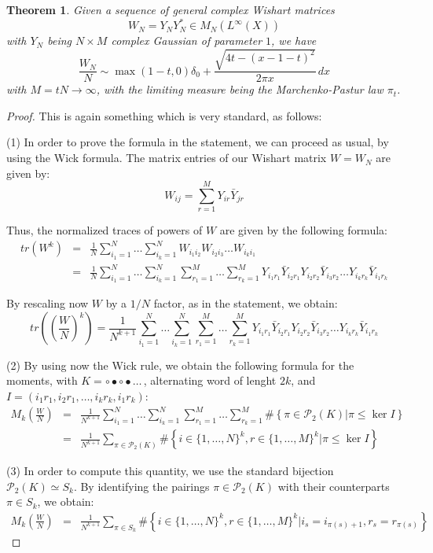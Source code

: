 \documentclass[12pt]{amsbook}
\newtheorem{theorem}{Theorem}[chapter]
\begin{document}
\begin{theorem}
Given a sequence of general complex Wishart matrices
$$W_N=Y_NY_N^*\in M_N(L^\infty(X))$$
with $Y_N$ being $N\times M$ complex Gaussian of parameter $1$, we have
$$\frac{W_N}{N}\sim\max(1-t,0)\delta_0+\frac{\sqrt{4t-(x-1-t)^2}}{2\pi x}\,dx$$
with $M=tN\to\infty$, with the limiting measure being the Marchenko-Pastur law $\pi_t$.
\end{theorem}

\begin{proof}
This is again something which is very standard, as follows:

\medskip

(1) In order to prove the formula in the statement, we can proceed as usual, by using the Wick formula. The matrix entries of our Wishart matrix $W=W_N$ are given by:
$$W_{ij}=\sum_{r=1}^MY_{ir}\bar{Y}_{jr}$$

Thus, the normalized traces of powers of $W$ are given by the following formula:
\begin{eqnarray*}
tr(W^k)
&=&\frac{1}{N}\sum_{i_1=1}^N\ldots\sum_{i_k=1}^NW_{i_1i_2}W_{i_2i_3}\ldots W_{i_ki_1}\\
&=&\frac{1}{N}\sum_{i_1=1}^N\ldots\sum_{i_k=1}^N\sum_{r_1=1}^M\ldots\sum_{r_k=1}^MY_{i_1r_1}\bar{Y}_{i_2r_1}Y_{i_2r_2}\bar{Y}_{i_3r_2}\ldots Y_{i_kr_k}\bar{Y}_{i_1r_k}
\end{eqnarray*}

By rescaling now $W$ by a $1/N$ factor, as in the statement, we obtain:
$$tr\left(\left(\frac{W}{N}\right)^k\right)=\frac{1}{N^{k+1}}\sum_{i_1=1}^N\ldots\sum_{i_k=1}^N\sum_{r_1=1}^M\ldots\sum_{r_k=1}^MY_{i_1r_1}\bar{Y}_{i_2r_1}Y_{i_2r_2}\bar{Y}_{i_3r_2}\ldots Y_{i_kr_k}\bar{Y}_{i_1r_k}$$

(2) By using now the Wick rule, we obtain the following formula for the moments, with $K=\circ\bullet\circ\bullet\ldots\,$, alternating word of lenght $2k$, and $I=(i_1r_1,i_2r_1,\ldots,i_kr_k,i_1r_k)$:
\begin{eqnarray*}
M_k\left(\frac{W}{N}\right)
&=&\frac{1}{N^{k+1}}\sum_{i_1=1}^N\ldots\sum_{i_k=1}^N\sum_{r_1=1}^M\ldots\sum_{r_k=1}^M\#\left\{\pi\in\mathcal P_2(K)\Big|\pi\leq\ker I\right\}\\
&=&\frac{1}{N^{k+1}}\sum_{\pi\in\mathcal P_2(K)}\#\left\{i\in\{1,\ldots,N\}^k,r\in\{1,\ldots,M\}^k\Big|\pi\leq\ker I\right\}
\end{eqnarray*}

(3) In order to compute this quantity, we use the standard bijection $\mathcal P_2(K)\simeq S_k$. By identifying the pairings $\pi\in\mathcal P_2(K)$ with their counterparts $\pi\in S_k$, we obtain:
\begin{eqnarray*}
M_k\left(\frac{W}{N}\right)
&=&\frac{1}{N^{k+1}}\sum_{\pi\in S_k}\#\left\{i\in\{1,\ldots,N\}^k,r\in\{1,\ldots,M\}^k\Big|i_s=i_{\pi(s)+1},r_s=r_{\pi(s)}\right\}
\end{eqnarray*}


\end{proof}
\end{document}
